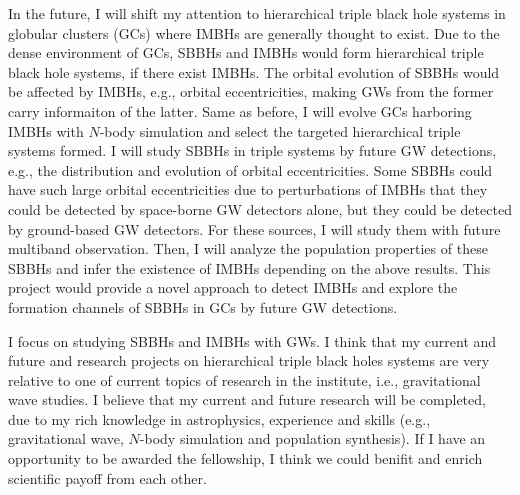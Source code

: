 \documentclass[12pt,a4paper,sans]{article}%
\begin{document}
In the future, I will shift my attention to hierarchical triple black hole systems in globular clusters (GCs) where
IMBHs are generally thought to exist. Due to the dense environment of GCs, SBBHs and IMBHs would form hierarchical
triple black hole systems, if there exist IMBHs. The orbital evolution of SBBHs would be affected by IMBHs, e.g.,
orbital eccentricities, making GWs
from the former carry informaiton of the latter. Same as before, I will evolve GCs harboring IMBHs with $N$-body simulation and
select the targeted hierarchical triple systems formed. I will study SBBHs in triple systems by future GW detections,
e.g., the distribution and evolution of orbital
eccentricities. Some SBBHs could have such large orbital eccentricities due to perturbations of IMBHs that they could be
detected by space-borne GW detectors alone, but they could be detected by ground-based GW detectors. For these sources,
I will study them with future multiband observation. Then, I will analyze the population properties of these SBBHs and infer the existence of IMBHs depending on the above results. This project would provide a novel approach to detect IMBHs and explore the formation channels of SBBHs in GCs by future GW detections.  

I focus on studying SBBHs and IMBHs with GWs. I think that my current and future and research projects on
hierarchical triple
black holes systems are very relative to one of current topics of research in the institute, i.e., gravitational wave
studies. I believe that my current and future research will be completed, due to my rich knowledge in astrophysics,
experience and skills (e.g., gravitational wave, $N$-body
simulation and population synthesis). If I have an opportunity to be awarded the fellowship, I think we could benifit and enrich scientific payoff from each other. 




%
\end{document}
